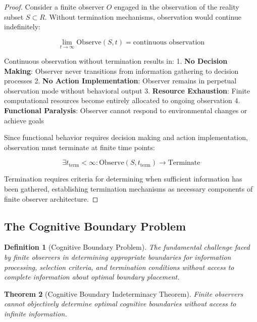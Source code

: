 \documentclass[12pt,a4paper]{article}
\newtheorem{theorem}{Theorem}[section]
\newtheorem{definition}[theorem]{Definition}
\begin{document}
\begin{proof}
Consider a finite observer $O$ engaged in the observation of the reality subset $S \subset R$. Without termination mechanisms, observation would continue indefinitely:

$$\lim_{t \to \infty} \text{Observe}(S, t) = \text{continuous observation}$$

Continuous observation without termination results in:
1. \textbf{No Decision Making}: Observer never transitions from information gathering to decision processes
2. \textbf{No Action Implementation}: Observer remains in perpetual observation mode without behavioral output
3. \textbf{Resource Exhaustion}: Finite computational resources become entirely allocated to ongoing observation
4. \textbf{Functional Paralysis}: Observer cannot respond to environmental changes or achieve goals

Since functional behavior requires decision making and action implementation, observation must terminate at finite time points:

$$\exists t_{\text{term}} < \infty : \text{Observe}(S, t_{\text{term}}) \to \text{Terminate}$$

Termination requires criteria for determining when sufficient information has been gathered, establishing termination mechanisms as necessary components of finite observer architecture.
\end{proof}

\subsection{The Cognitive Boundary Problem}

\begin{definition}[Cognitive Boundary Problem]
The fundamental challenge faced by finite observers in determining appropriate boundaries for information processing, selection criteria, and termination conditions without access to complete information about optimal boundary placement.
\end{definition}

\begin{theorem}[Cognitive Boundary Indeterminacy Theorem]
Finite observers cannot objectively determine optimal cognitive boundaries without access to infinite information.
\end{theorem}
\end{document}
